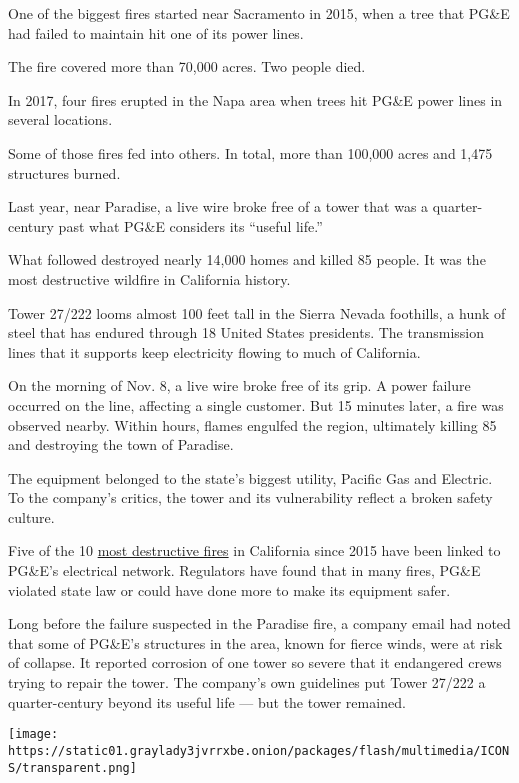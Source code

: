 One of the biggest fires started near Sacramento in 2015, when a tree
that PG\&E had failed to maintain hit one of its power lines.

The fire covered more than 70,000 acres. Two people died.

In 2017, four fires erupted in the Napa area when trees hit PG\&E power
lines in several locations.

Some of those fires fed into others. In total, more than 100,000 acres
and 1,475 structures burned.

Last year, near Paradise, a live wire broke free of a tower that was a
quarter-century past what PG\&E considers its ``useful life.''

What followed destroyed nearly 14,000 homes and killed 85 people. It was
the most destructive wildfire in California history.

Tower 27/222 looms almost 100 feet tall in the Sierra Nevada foothills,
a hunk of steel that has endured through 18 United States presidents.
The transmission lines that it supports keep electricity flowing to much
of California.

On the morning of Nov. 8, a live wire broke free of its grip. A power
failure occurred on the line, affecting a single customer. But 15
minutes later, a fire was observed nearby. Within hours, flames engulfed
the region, ultimately killing 85 and destroying the town of Paradise.

The equipment belonged to the state's biggest utility, Pacific Gas and
Electric. To the company's critics, the tower and its vulnerability
reflect a broken safety culture.

Five of the 10
\href{http://www.fire.ca.gov/communications/downloads/fact_sheets/Top20_Destruction.pdf}{most
destructive fires} in California since 2015 have been linked to PG\&E's
electrical network. Regulators have found that in many fires, PG\&E
violated state law or could have done more to make its equipment safer.

Long before the failure suspected in the Paradise fire, a company email
had noted that some of PG\&E's structures in the area, known for fierce
winds, were at risk of collapse. It reported corrosion of one tower so
severe that it endangered crews trying to repair the tower. The
company's own guidelines put Tower 27/222 a quarter-century beyond its
useful life --- but the tower remained.

\texttt{[image: https://static01.graylady3jvrrxbe.onion/packages/flash/multimedia/ICONS/transparent.png]}

